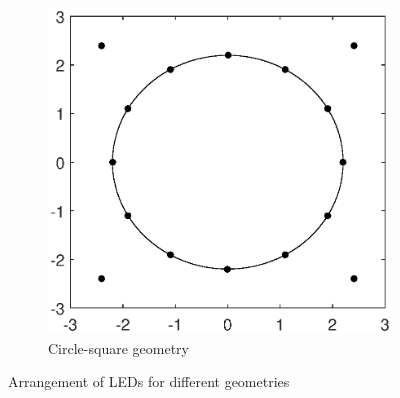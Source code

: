 \documentclass{beamer}
\theoremstyle{remark}
\begin{document}
\begin{frame}
\begin{figure}[h!]
    \begin{subfigure}[t]{0.5\columnwidth}
        \centering
        \includegraphics[scale=.25]{LedArrangementPaper}
        \caption{Circle-square geometry }
\label{fig1:subfig4}
    \end{subfigure}
       \caption{Arrangement of LEDs for different geometries}
    \label{geometries}
\end{figure}
\end{frame}
\end{document}

